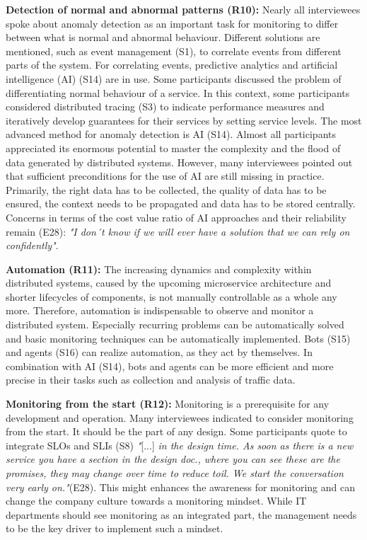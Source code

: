 \documentclass[runningheads]{llncs}
\begin{document}
\textbf{Detection of normal and abnormal patterns (R10):} Nearly all interviewees spoke about anomaly detection as an important task for monitoring to differ between what is normal and abnormal behaviour. Different solutions are mentioned, such as event management (S1), to correlate events from different parts of the system. For correlating events, predictive analytics and artificial intelligence (AI) (S14) are in use. Some participants discussed the problem of differentiating normal behaviour of a service. In this context, some participants considered distributed tracing (S3) to indicate performance measures and iteratively develop guarantees for their services by setting service levels. The most advanced method for anomaly detection is AI (S14). Almost all participants appreciated its enormous potential to master the complexity and the flood of data generated by distributed systems. However, many interviewees pointed out that sufficient preconditions for the use of AI are still missing in practice. Primarily, the right data has to be collected, the quality of data has to be ensured, the context needs to be propagated and data has to be stored centrally. Concerns in terms of the cost value ratio of AI approaches and their reliability remain (E28): \textit{"I don´t know if we will ever have a solution that we can rely on confidently"}.

\textbf{Automation (R11):} The increasing dynamics and complexity within distributed systems, caused by the upcoming microservice architecture and shorter lifecycles of components, is not manually controllable as a whole any more. Therefore, automation is indispensable to observe and monitor a distributed system. Especially recurring problems can be automatically solved and basic monitoring techniques can be automatically implemented. Bots (S15) and agents (S16) can realize automation, as they act by themselves. In combination with AI (S14), bots and agents can be more efficient and more precise in their tasks such as collection and analysis of traffic data.

\textbf{Monitoring from the start (R12):} Monitoring is a prerequisite for any development and operation. Many interviewees indicated to consider monitoring from the start. It should be the part of any design. Some participants quote to integrate SLOs and SLIs (S8) \textit{"}[...] \textit{in the design time. As soon as there is a new service you have a section in the design doc., where you can see these are the promises, they may change over time to reduce toil. We start the conversation very early on."}(E28). This might enhances the awareness for monitoring and can change the company culture towards a monitoring mindset. While IT departments should see monitoring as an integrated part, the management needs to be the key driver to implement such a mindset.
\end{document}
